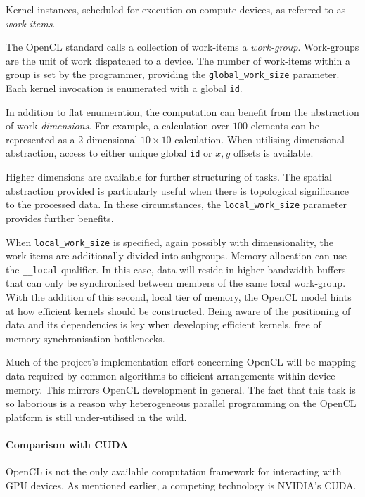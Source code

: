 Kernel instances, scheduled for execution on compute-devices, as referred to as \emph{work-items}.

The \ac{OpenCL} standard calls a collection of work-items a \emph{work-group}. Work-groups are the unit of work dispatched to a device. The number of work-items within a group is set by the programmer, providing the \verb|global_work_size| parameter. Each kernel invocation is enumerated with a global \verb|id|. 

In addition to flat enumeration, the computation can benefit from the abstraction of work \emph{dimensions}. For example, a calculation over $100$ elements can be represented as a 2-dimensional $10 \times 10$ calculation. When utilising dimensional abstraction, access to either unique global \verb|id| or $x, y$ offsets is available.

Higher dimensions are available for further structuring of tasks. The spatial abstraction provided is particularly useful when there is topological significance to the processed data. In these circumstances, the \verb|local_work_size| parameter provides further benefits.

When \verb|local_work_size| is specified, again possibly with dimensionality, the work-items are additionally divided into subgroups. Memory allocation can use the \verb|__local| qualifier. In this case, data will reside in higher-bandwidth buffers that can only be synchronised between members of the same local work-group. With the addition of this second, local tier of memory, the \ac{OpenCL} model hints at how efficient kernels should be constructed. Being aware of the positioning of data and its dependencies is key when developing efficient kernels, free of memory-synchronisation bottlenecks.

Much of the project's implementation effort concerning \ac{OpenCL} will be mapping data required by common algorithms to efficient arrangements within device memory. This mirrors \ac{OpenCL} development in general.
The fact that this task is so laborious is a reason why heterogeneous parallel programming on the \ac{OpenCL} platform is still under-utilised in the wild.

\paragraph*{Comparison with CUDA}
\ac{OpenCL} is not the only available computation framework for interacting with \ac{GPU} devices. As mentioned earlier, a competing technology is NVIDIA's \ac{CUDA}.

